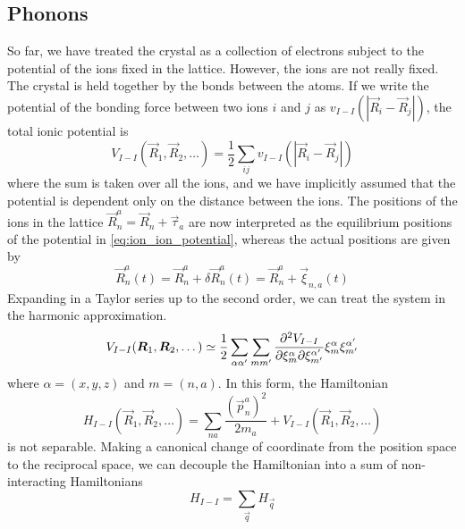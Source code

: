 \subsection{Phonons} \label{sec:phonons}
So far, we have treated the crystal as a collection of electrons subject to the potential of the ions fixed in the lattice. However, the ions are not really fixed. The crystal is held together by the bonds between the atoms. If we write the potential of the bonding force between two ions $i$ and $j$ as $v_{I-I}(|\vec{R}_i - \vec{R}_j|)$, the total ionic potential is
\begin{equation} \label{eq:ion_ion_potential}
    V_{I-I}(\vec{R}_1, \vec{R}_2, \dots) = \frac{1}{2} \sum_{ij} v_{I-I}(|\vec{R}_i - \vec{R}_j|)
\end{equation}
where the sum is taken over all the ions, and we have implicitly assumed that the potential is dependent only on the distance between the ions. The positions of the ions in the lattice
$
    \vec{R}_n^a = \vec{R}_n + \vec{\tau}_a
$
are now interpreted as the equilibrium positions of the potential in \cref{eq:ion_ion_potential}, whereas the actual positions are given by
\begin{equation} \label{eq:atom_position_perturbed}
    \vec{R}_n^a(t) = \vec{R}_n^a + \delta \vec{R}_n^a(t) = \vec{R}_n^a + \vec{\xi}_{n,a}(t)
\end{equation}
Expanding  in a Taylor series up to the second order, we can treat the system in the harmonic approximation.
\begin{equation}
    V_{I-I}(\mathbf{\boldsymbol{R}}_1, \mathbf{\boldsymbol{R}}_2, \dots) \simeq \frac{1}{2} \sum_{\alpha \alpha'} \sum_{m m'} \frac{\partial^2 V_{I-I}}{\partial \xi_m^\alpha \partial \xi_{m'}^{\alpha'}} \xi_m^\alpha \xi_{m'}^{\alpha'}
\end{equation}
where $\alpha = (x,y,z)$ and $m = (n,a)$.
In this form, the Hamiltonian
\begin{equation} \label{eq:lattice_hamiltonian}
    H_{I-I}(\vec{R}_1, \vec{R}_2, \dots) = \sum_{na} \frac{(\vec{p}_n^a)^2}{2m_a} + V_{I-I}(\vec{R}_1, \vec{R}_2, \dots)
\end{equation}
is not separable. Making a canonical change of coordinate from the position space to the reciprocal space, we can decouple the Hamiltonian into a sum of non-interacting Hamiltonians
\begin{equation}
    H_{I-I} = \sum_\vec{q} H_\vec{q}
\end{equation}
